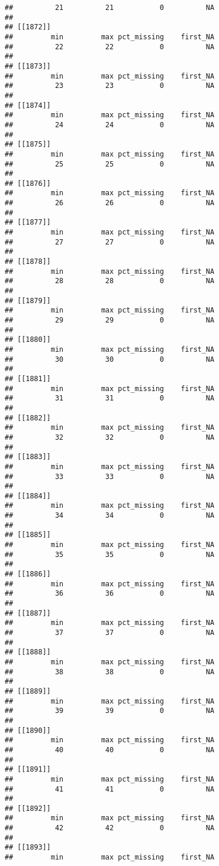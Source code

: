 \documentclass[
]{article}
\begin{document}
\begin{verbatim}
##          21          21           0          NA 
## 
## [[1872]]
##         min         max pct_missing    first_NA 
##          22          22           0          NA 
## 
## [[1873]]
##         min         max pct_missing    first_NA 
##          23          23           0          NA 
## 
## [[1874]]
##         min         max pct_missing    first_NA 
##          24          24           0          NA 
## 
## [[1875]]
##         min         max pct_missing    first_NA 
##          25          25           0          NA 
## 
## [[1876]]
##         min         max pct_missing    first_NA 
##          26          26           0          NA 
## 
## [[1877]]
##         min         max pct_missing    first_NA 
##          27          27           0          NA 
## 
## [[1878]]
##         min         max pct_missing    first_NA 
##          28          28           0          NA 
## 
## [[1879]]
##         min         max pct_missing    first_NA 
##          29          29           0          NA 
## 
## [[1880]]
##         min         max pct_missing    first_NA 
##          30          30           0          NA 
## 
## [[1881]]
##         min         max pct_missing    first_NA 
##          31          31           0          NA 
## 
## [[1882]]
##         min         max pct_missing    first_NA 
##          32          32           0          NA 
## 
## [[1883]]
##         min         max pct_missing    first_NA 
##          33          33           0          NA 
## 
## [[1884]]
##         min         max pct_missing    first_NA 
##          34          34           0          NA 
## 
## [[1885]]
##         min         max pct_missing    first_NA 
##          35          35           0          NA 
## 
## [[1886]]
##         min         max pct_missing    first_NA 
##          36          36           0          NA 
## 
## [[1887]]
##         min         max pct_missing    first_NA 
##          37          37           0          NA 
## 
## [[1888]]
##         min         max pct_missing    first_NA 
##          38          38           0          NA 
## 
## [[1889]]
##         min         max pct_missing    first_NA 
##          39          39           0          NA 
## 
## [[1890]]
##         min         max pct_missing    first_NA 
##          40          40           0          NA 
## 
## [[1891]]
##         min         max pct_missing    first_NA 
##          41          41           0          NA 
## 
## [[1892]]
##         min         max pct_missing    first_NA 
##          42          42           0          NA 
## 
## [[1893]]
##         min         max pct_missing    first_NA 

\end{verbatim}
\end{document}
